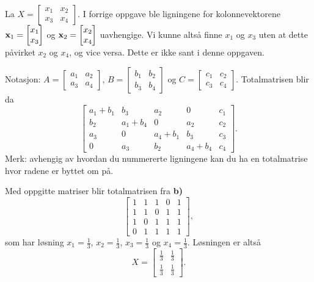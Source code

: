 \begin{losning}

\begin{punkt}
La $X=\begin{bmatrix}
x_1 & x_2\\
x_3 & x_4
\end{bmatrix}.$ I forrige oppgave ble ligningene for kolonnevektorene $\mathbf{x}_1=\begin{bmatrix}
x_1\\
x_3
\end{bmatrix}$ og $\mathbf{x}_2=\begin{bmatrix}
x_2\\
x_4
\end{bmatrix}$ uavhengige. Vi kunne altså finne $x_1$ og $x_3$ uten at dette påvirket $x_2$ og $x_4$, og vice versa. Dette er ikke sant i denne oppgaven.
\end{punkt}

\begin{punkt}
Notasjon: $A=\begin{bmatrix}
a_1 & a_2\\
a_3 & a_4
\end{bmatrix}$, $B=\begin{bmatrix}
b_1 & b_2\\
b_3 & b_4
\end{bmatrix}$ og $C=\begin{bmatrix}
c_1 & c_2\\
c_3 & c_4
\end{bmatrix}$. Totalmatrisen blir da $$\begin{bmatrix}
a_1+b_1 & b_3 & a_2 & 0 & c_1\\
b_2 & a_1+b_4 & 0 & a_2 & c_2\\
a_3 & 0 & a_4+b_1 & b_3 & c_3\\
0 & a_3 & b_2 & a_4+b_4 & c_4
\end{bmatrix}.$$ Merk: avhengig av hvordan du nummererte ligningene kan du ha en totalmatrise hvor radene er byttet om på.
\end{punkt}


\begin{punkt}
Med oppgitte matriser blir totalmatrisen fra \textbf{b)}$$\begin{bmatrix}
1 & 1 & 1 & 0 & 1\\
1 & 1 & 0 & 1 & 1\\
1 & 0 & 1 & 1 & 1\\
0 & 1 & 1 & 1 & 1
\end{bmatrix},$$ som har løsning $x_1=\frac{1}{3}$, $x_2=\frac{1}{3}$, $x_3=\frac{1}{3}$ og $x_4=\frac{1}{3}$. Løsningen er altså   
$$X=\begin{bmatrix}
\frac{1}{3} & \frac{1}{3}\\
\frac{1}{3} & \frac{1}{3}
\end{bmatrix}.$$
\end{punkt}

\end{losning}


